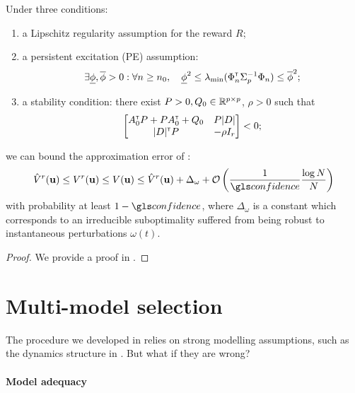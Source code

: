 \begin{theorem}
	\label{thm:minimax-regret-bound}
	\begin{leftbar}[theorembar]
	Under three conditions:
	\begin{enumerate}
		\item a Lipschitz regularity assumption for the reward $R$;
		\item a persistent excitation (PE) assumption:
		\begin{align*}
		\exists \underline{\phi},\overline{\phi}>0: \forall n\geq n_0,\quad \underline{\phi}^2 \leq \lambda_{\min}(\Phi_{n}^{\mathsf{\scriptscriptstyle T}}\Sigma_{p}^{-1}\Phi_{n}) \leq \overline{\phi}^2;
		\end{align*}
		\item a stability condition: there exist $P>0,Q_0\in\mathbb{R}^{p\times p}$, $\rho>0$ such that
		$$\begin{bmatrix}
		A_0^{\mathsf{\scriptscriptstyle T}} P + P A_0^{\mathsf{\scriptscriptstyle T}} + Q_0 & P|D|  \\
		|D|^{\mathsf{\scriptscriptstyle T}} P & -\rho I_r \\
		\end{bmatrix}< 0;$$
	\end{enumerate}
	we can bound the approximation error of :
	\begin{equation*}
	\hat{V}^r(\bu) \leq {V}^r(\bu) \leq V(\bu) \leq \hat{V}^r(\bu) + \Delta_\omega + \cO\left(\frac{1}{\confidence}\frac{\log N}{N}\right)
	\end{equation*}
	with probability at least $1-\confidence$, where $\Delta_\omega$ is a constant which corresponds to an irreducible suboptimality suffered from being robust to instantaneous perturbations $\omega(t)$.
	\end{leftbar}
\end{theorem}
\begin{proof}
	We provide a proof in .
\end{proof}

\section{Multi-model selection}
\label{sec:multi-model}

The procedure we developed in  relies on strong modelling assumptions, such as the dynamics structure in . But what if they are wrong?

\paragraph{Model adequacy}

